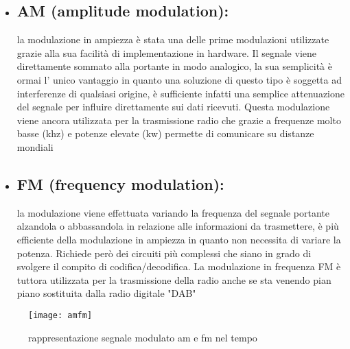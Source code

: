 \begin{itemize}
   	\item \subsection{AM (amplitude modulation): } la modulazione in ampiezza è stata una delle prime modulazioni utilizzate grazie alla sua facilità di implementazione in hardware. Il segnale viene direttamente sommato alla portante in modo analogico, la sua semplicità è ormai l' unico vantaggio in quanto una soluzione di questo tipo è soggetta ad interferenze di qualsiasi origine, è sufficiente infatti una semplice attenuazione del segnale per influire direttamente sui dati ricevuti. Questa modulazione viene ancora utilizzata per la trasmissione radio che grazie a frequenze molto basse (khz) e potenze elevate (kw) permette di comunicare su distanze mondiali
   \item \subsection{FM (frequency modulation): } la modulazione viene effettuata variando la frequenza del segnale portante alzandola o abbassandola in relazione alle informazioni da trasmettere, è più efficiente della modulazione in ampiezza in quanto non necessita di variare la potenza. Richiede però dei circuiti più complessi che siano in grado di svolgere il compito di codifica/decodifica. La modulazione in frequenza FM è tuttora utilizzata per la trasmissione della radio anche se sta venendo pian piano sostituita dalla radio digitale "DAB"
  \end{itemize}
  \begin{figure}[h]
  	\centering
  	\texttt{[image: amfm]}
  	\caption{rappresentazione segnale modulato am e fm nel tempo}\label{fig:1}
  \end{figure}


